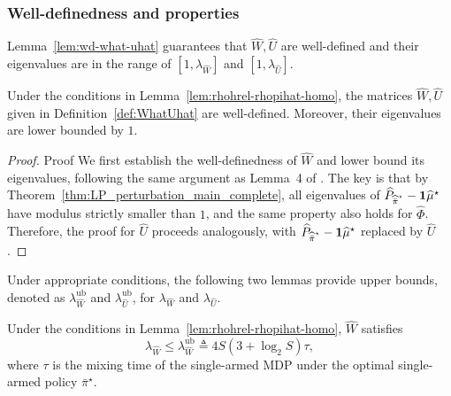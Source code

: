 \documentclass[mnsc,nonblindrev]{informs3}
\newcommand{\lwhat}{\lambda_{\widehat{W}}}
\newcommand{\luhat}{\lambda_{\widehat{U}}}
\newcommand{\ublwhat}{\lambda^{\mathrm{ub}}_{\widehat{W}}}
\newcommand{\ubluhat}{\lambda^{\mathrm{ub}}_{\widehat{U}}}
\newcommand{\Phat}{\widehat{P}}
\newcommand{\one}{\mathbf{1}}
\newcommand{\pihbst}{\widehat{\Bar{\pi}}^\star}
\newcommand{\phihat}{\widehat{\Phi}}
\newcommand{\uhat}{\widehat{U}}
\newcommand{\muhst}{\widehat{\mu}^\star}
\begin{document}
\begin{APPENDICES}
\subsubsection{Well-definedness and properties}\label{subsec:wd-pro}

Lemma~\ref{lem:wd-what-uhat} guarantees that $\widehat W, \uhat$ are well-defined and their eigenvalues are in the range of $[1,\lwhat]$ and $[1,\luhat]$.
\begin{lemma}\label{lem:wd-what-uhat}
    Under the conditions in Lemma~\ref{lem:rhohrel-rhopihat-homo}, the matrices $\widehat W, \uhat$ given in Definition~\ref{def:WhatUhat} are well-defined. Moreover, their eigenvalues are lower bounded by $1$.
\end{lemma}
\begin{proof}{Proof}
We first establish the well-definedness of $\widehat{W}$ and lower bound its eigenvalues, following the same argument as Lemma~4 of \citet{hong2024achieving}. The key is that by Theorem~\ref{thm:LP_perturbation_main_complete}, all eigenvalues of $\Phat_{\pihbst}-\one\muhst$ have modulus strictly smaller than $1$, and the same property also holds for $\phihat$. Therefore, the proof for $\uhat$ proceeds analogously, with $\Phat_{\pihbst}-\one\muhst$ replaced by $\uhat$.
\end{proof}

Under appropriate conditions, the following two lemmas provide upper bounds, denoted as $\ublwhat$ and $\ubluhat$, for $\lwhat$ and $\luhat$. 
\begin{lemma}\label{lem:bound_of_lwhat}
   Under the conditions in Lemma~\ref{lem:rhohrel-rhopihat-homo}, \(\widehat{W}\) satisfies
    \begin{equation}\label{def:ublwhat}
        \lwhat \leq \ublwhat \triangleq 4S(3+\log_2S)\tau,
    \end{equation}
    where \( \tau\) is the mixing time of the single-armed MDP under the optimal single-armed policy $\bar\pi^\star$.
\end{lemma}


\end{APPENDICES}
\end{document}
